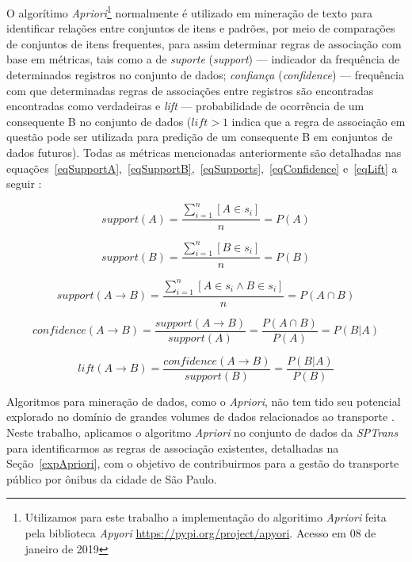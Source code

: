 \documentclass[
	12pt,				%
	oneside,			%
	a4paper,			%
	english,			%
	brazil				%
	]{abntex2ppgsi}
\begin{document}
{{{O algorítimo \textit{Apriori}\footnote{Utilizamos para este trabalho a implementação do algoritimo \textit{Apriori} feita pela biblioteca \textit{Apyori}  \url{https://pypi.org/project/apyori}. Acesso em 08 de janeiro de 2019} normalmente é utilizado em mineração de texto para identificar relações entre conjuntos de itens e padrões, por meio de comparações de conjuntos de itens frequentes, para assim determinar regras de associação com base em métricas, tais como a de \textit{suporte} (\textit{support}) --- indicador da frequência de determinados registros no conjunto de dados; \textit{confiança} (\textit{confidence}) --- frequência com que determinadas regras de associações entre registros são encontradas encontradas como verdadeiras e \textit{lift} --- probabilidade de ocorrência de um consequente B no conjunto de dados  ($lift > 1$ indica que a regra de associação em questão pode ser utilizada para predição de um consequente B em conjuntos de dados futuros). Todas as métricas mencionadas anteriormente são detalhadas nas equações~\ref{eqSupportA},~\ref{eqSupportB},~\ref{eqSupports},~\ref{eqConfidence} e~\ref{eqLift} a seguir  \cite{park2018apriori}:

\begin{equation}
\label{eqSupportA}
support(A) = \dfrac{\sum_{i=1}^{n}[A \in s_i]} {n} = P(A) 
\end{equation}

\begin{equation}
\label{eqSupportB}
support(B) = \dfrac{\sum_{i=1}^{n}[B \in s_i]} {n} = P(B) 
\end{equation}

\begin{equation}
\label{eqSupports}
support(A \rightarrow B) = \dfrac{\sum_{i=1}^{n}[A \in s_i \land B \in s_i]} {n} = P(A \cap B)
\end{equation}

\begin{equation}
\label{eqConfidence}
confidence(A \rightarrow B) = \dfrac{support(A \rightarrow B)}{support(A)} = \dfrac{P(A \cap B)}{P(A)} = P(B|A)
\end{equation}

\begin{equation}
\label{eqLift}
lift(A \rightarrow B) = \dfrac{confidence(A \rightarrow B)}{support(B)} = \dfrac{P(B|A)}{P(B)}
\end{equation}

Algoritmos para mineração de dados, como o \textit{Apriori}, não tem tido seu potencial explorado no domínio de grandes volumes de dados relacionados ao transporte \cite{park2018apriori}. Neste trabalho, aplicamos o algoritmo \textit{Apriori} no conjunto de dados da \textit{SPTrans} para identificarmos as regras de associação existentes, detalhadas na Seção~\ref{expApriori}, com o objetivo de contribuirmos para a gestão do transporte público por ônibus da cidade de São Paulo.   

}}}
\end{document}
